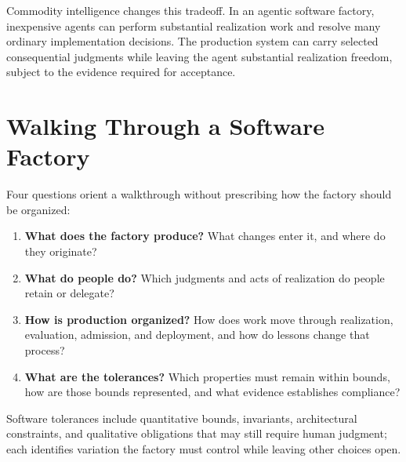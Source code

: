 
Commodity intelligence changes this tradeoff. In an agentic software factory, inexpensive agents can perform substantial realization work and resolve many ordinary implementation decisions. The production system can carry selected consequential judgments while leaving the agent substantial realization freedom, subject to the evidence required for acceptance.

\section{Walking Through a Software Factory}\label{heading:walking-through-a-software-factory}


Four questions orient a walkthrough without prescribing how the factory should be organized:

\begin{enumerate}
\def\labelenumi{\arabic{enumi}.}
\tightlist
\item
  \textbf{What does the factory produce?} What changes enter it, and where do they originate?
\item
  \textbf{What do people do?} Which judgments and acts of realization do people retain or delegate?
\item
  \textbf{How is production organized?} How does work move through realization, evaluation, admission, and deployment, and how do lessons change that process?
\item
  \textbf{What are the tolerances?} Which properties must remain within bounds, how are those bounds represented, and what evidence establishes compliance?
\end{enumerate}


Software tolerances include quantitative bounds, invariants, architectural constraints, and qualitative obligations that may still require human judgment; each identifies variation the factory must control while leaving other choices open.


